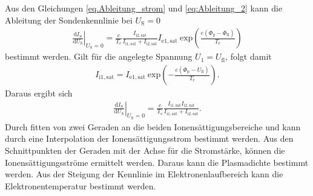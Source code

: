 Aus den Gleichungen \eqref{eq.Ableitung_strom} und \eqref{eq:Ableitung_2} kann die Ableitung der Sondenkennlinie bei $U_{\mathrm{S}}=0$ 
\begin{align}
\left. \frac{\mathrm{d} I_{\mathrm{S}}}{\mathrm{d} U_{\mathrm{S}}}\right\vert_{U_{\mathrm{S}}=0} = \frac{e}{T_{\mathrm{e}}}  \frac{I_{\mathrm{i}2,\mathrm{sat}}}{I_{\mathrm{i}1,\mathrm{sat}}+I_{\mathrm{i}2,\mathrm{sat}}}  I_{\mathrm{e}1,\mathrm{sat}}\ \mathrm{exp} \left( \frac{e(\Phi_{\mathrm{p}}-\Phi_{\mathrm{fl}})}{T_{\mathrm{e}}}\right)
\end{align}
bestimmt werden. Gilt für die angelegte Spannung $U_1=U_{\mathrm{fl}}$, folgt damit
\begin{align}
I_{\mathrm{i}1,\mathrm{sat}} =I_{\mathrm{e}1,\mathrm{sat}}\ \mathrm{exp} \left( -\frac{e(\Phi_{\mathrm{p}}-U_\text{fl})}{T_{\mathrm{e}}} \right).
\end{align}
Daraus ergibt sich
\begin{align}
\left. \frac{\mathrm{d} I_{\mathrm{S}}}{\mathrm{d} U_{\mathrm{S}}}\right\vert_{U_{\mathrm{S}}=0} = \frac{e}{T_{\mathrm{e}}}\frac{I_{\mathrm{i}1,\mathrm{sat}} I_{\mathrm{i}2,\mathrm{sat}} }{I_{\mathrm{i}1,\mathrm{sat}}+I_{\mathrm{i}2,\mathrm{sat}}}.
\end{align}
Durch fitten von zwei Geraden an die beiden Ionensättigungsbereiche und kann durch eine Interpolation der Ionensättigungsstrom bestimmt werden. Aus den Schnittpunkten der Geraden mit der Achse für die Stromstärke, können die Ionensättigungsströme ermittelt werden. Daraus kann die Plasmadichte bestimmt werden.  Aus der Steigung der Kennlinie im Elektronenlaufbereich kann die Elektronentemperatur bestimmt werden. 

